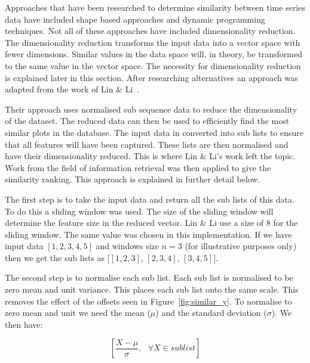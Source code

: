 Approaches that have been researched to determine similarity between time series data have included shape based approaches and dynamic programming techniques.  Not all of these approaches have included dimensionality reduction.  The dimensionality reduction transforms the input data into a vector space with fewer dimensions.  Similar values in the data space will, in theory, be transformed to the same value in the vector space.  The necessity for dimensionality reduction is explained later in this section.  After researching alternatives an approach was adapted from the work of Lin \& Li~\cite{structural_similarity}.

Their approach uses normalised sub sequence data to reduce the dimensionality of the dataset.  The reduced data can then be used to efficiently find the most similar plots in the database.  The input data in converted into sub lists to ensure that all features will have been captured.  These lists are then normalised and have their dimensionality reduced.  This is where Lin \& Li's work left the topic.  Work from the field of information retrieval was then applied to give the similarity ranking. This approach is explained in further detail below.

The first step is to take the input data and return all the sub lists of this data.  To do this a sliding window was used.  The size of the sliding window will determine the feature size in the reduced vector.  Lin \& Li use a size of 8 for the sliding window.  The same value was chosen in this implementation.  If we have input data $[1,2,3,4,5]$ and windows size $n = 3$ (for illustrative purposes only) then we get the sub lists as $[[1,2,3]$, $[2,3,4]$, $[3,4,5]]$.

The second step is to normalise each sub list.  Each sub list is normalised to be zero mean and unit variance.  This places each sub list onto the same scale.  This removes the effect of the offsets seen in Figure~\ref{fig:similar_y}.  To normalise to zero mean and unit we need the mean ($\mu$) and the standard deviation ($\sigma$).  We then have:

$$
\left[\frac{X - \mu}{\sigma},\text{   } \forall X \in sublist\right]
$$

